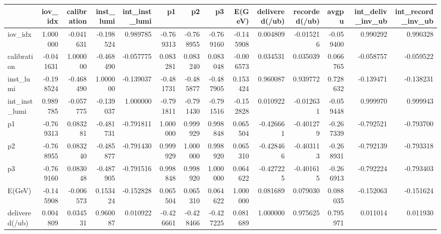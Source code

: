 \begin{tabular}{lrrrrrrrrrrrrr}
\toprule
{} &   iov\_idx &  calibration &  inst\_lumi &  int\_inst\_lumi &        p1 &        p2 &        p3 &    E(GeV) &  delivered(/ub) &  recorded(/ub) &     avgpu &  int\_deliv\_inv\_ub &  int\_record\_inv\_ub \\
\midrule
iov\_idx           &  1.000000 &    -0.041631 &  -0.198524 &       0.989785 & -0.769313 & -0.768955 & -0.769160 & -0.145908 &        0.004809 &      -0.015216 & -0.059400 &          0.990292 &           0.990328 \\
calibration       & -0.041631 &     1.000000 &  -0.468490 &      -0.057775 &  0.083281 &  0.083240 &  0.083048 & -0.006573 &        0.034531 &       0.035039 &  0.066765 &         -0.058757 &          -0.059522 \\
inst\_lumi         & -0.198524 &    -0.468490 &   1.000000 &      -0.139037 & -0.481731 & -0.485877 & -0.487905 &  0.153424 &        0.960087 &       0.939772 &  0.728632 &         -0.139471 &          -0.138231 \\
int\_inst\_lumi     &  0.989785 &    -0.057775 &  -0.139037 &       1.000000 & -0.791811 & -0.791430 & -0.791516 & -0.152828 &        0.010922 &      -0.012631 & -0.059448 &          0.999970 &           0.999943 \\
p1                & -0.769313 &     0.083281 &  -0.481731 &      -0.791811 &  1.000000 &  0.999929 &  0.998848 &  0.065504 &       -0.426661 &      -0.401279 & -0.267339 &         -0.792521 &          -0.793700 \\
p2                & -0.768955 &     0.083240 &  -0.485877 &      -0.791430 &  0.999929 &  1.000000 &  0.998920 &  0.065310 &       -0.428466 &      -0.403113 & -0.268931 &         -0.792139 &          -0.793318 \\
p3                & -0.769160 &     0.083048 &  -0.487905 &      -0.791516 &  0.998848 &  0.998920 &  1.000000 &  0.064622 &       -0.427225 &      -0.401615 & -0.266913 &         -0.792224 &          -0.793403 \\
E(GeV)            & -0.145908 &    -0.006573 &   0.153424 &      -0.152828 &  0.065504 &  0.065310 &  0.064622 &  1.000000 &        0.081689 &       0.079030 &  0.088035 &         -0.152063 &          -0.151624 \\
delivered(/ub)    &  0.004809 &     0.034531 &   0.960087 &       0.010922 & -0.426661 & -0.428466 & -0.427225 &  0.081689 &        1.000000 &       0.975625 &  0.795971 &          0.011014 &           0.011930 \\

\end{tabular}
